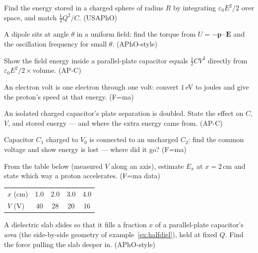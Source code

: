 \begin{exercise}[hard]
Find the energy stored in a charged sphere of radius $R$ by integrating
$\varepsilon_0E^{2}/2$ over space, and match $\tfrac12Q^{2}/C$.
(USAPhO)
\end{exercise}
\begin{exercise}[hard]
A dipole sits at angle $\theta$ in a uniform field: find the torque
from $U=-\mathbf p\cdot\mathbf E$ and the oscillation frequency for
small $\theta$. (APhO-style)
\end{exercise}
\begin{exercise}[medium]
Show the field energy inside a parallel-plate capacitor equals
$\tfrac12CV^{2}$ directly from $\varepsilon_0E^{2}/2\times$volume.
(AP-C)
\end{exercise}
\begin{exercise}[medium]
An electron volt is one electron through one volt: convert $1$\,eV to
joules and give the proton's speed at that energy. (F=ma)
\end{exercise}
\begin{exercise}[easy]
An isolated charged capacitor's plate separation is doubled. State the
effect on $C$, $V$, and stored energy --- and where the extra energy
came from. (AP-C)
\end{exercise}
\begin{exercise}[medium]
Capacitor $C_1$ charged to $V_0$ is connected to an uncharged $C_2$:
find the common voltage and show energy is lost --- where did it go?
(F=ma)
\end{exercise}
\begin{exercise}[medium]
From the table below (measured $V$ along an axis), estimate $E_x$ at
$x=2$\,cm and state which way a proton accelerates. (F=ma data)
\begin{center}\begin{tabular}{lcccc}
\toprule
$x$ (cm) & 1.0 & 2.0 & 3.0 & 4.0\\
$V$ (V) & 40 & 28 & 20 & 16\\
\bottomrule
\end{tabular}\end{center}
\end{exercise}
\begin{exercise}[hard]
A dielectric slab slides so that it fills a fraction $x$ of a
parallel-plate capacitor's \emph{area} (the side-by-side geometry of
example~\ref{ex:halfdiel}), held at fixed $Q$. Find the force pulling
the slab deeper in. (APhO-style)
\end{exercise}
